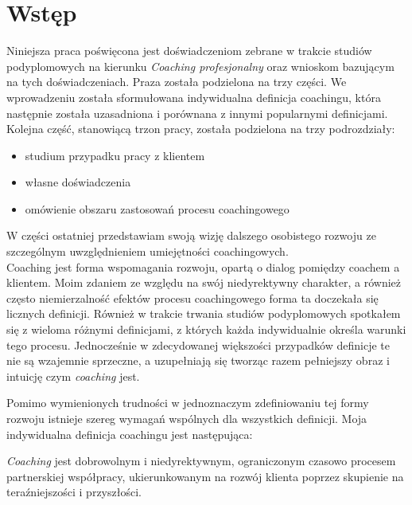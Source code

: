\chapter{Wstęp}


Niniejsza praca poświęcona jest doświadczeniom zebrane w trakcie studiów podyplomowych na kierunku \emph{Coaching profesjonalny} oraz wnioskom bazującym na tych doświadczeniach. Praza została podzielona na trzy części. We wprowadzeniu została sformułowana indywidualna definicja coachingu, która następnie została uzasadniona i porównana z innymi popularnymi definicjami. Kolejna część, stanowiącą trzon pracy, została podzielona na trzy podrozdziały:
\begin{itemize}
  \item studium przypadku pracy z klientem
  \item własne doświadczenia
  \item omówienie obszaru zastosowań procesu coachingowego
\end{itemize}
W części ostatniej przedstawiam swoją wizję dalszego osobistego rozwoju ze szczególnym uwzględnieniem umiejętności coachingowych. \\

Coaching jest forma wspomagania rozwoju, opartą o dialog pomiędzy coachem a klientem. Moim zdaniem ze względu na swój niedyrektywny charakter, a również często niemierzalność efektów procesu coachingowego forma ta doczekała się licznych definicji. Również w trakcie trwania studiów podyplomowych spotkałem się z wieloma różnymi definicjami, z których każda indywidualnie określa warunki tego procesu. Jednocześnie w zdecydowanej większości przypadków definicje te nie są wzajemnie sprzeczne, a uzupełniają się tworząc razem pełniejszy obraz i intuicję czym \emph{coaching} jest.

Pomimo wymienionych trudności w jednoznaczym zdefiniowaniu tej formy rozwoju istnieje szereg wymagań wspólnych dla wszystkich definicji. Moja indywidualna definicja coachingu jest następująca:
\begin{defn} \emph{Coaching} jest dobrowolnym i niedyrektywnym, ograniczonym czasowo procesem partnerskiej współpracy, ukierunkowanym na rozwój klienta poprzez skupienie na teraźniejszości i przyszłości.\end{defn}

